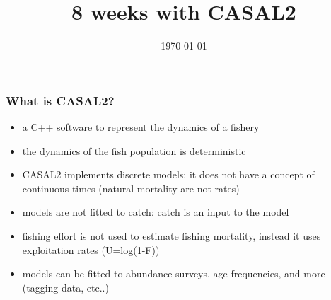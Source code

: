 \documentclass{beamer}
\title[]{8 weeks with CASAL2} %
\date{\today} %
\begin{document}
\begin{frame}
\titlepage %
\end{frame}






\begin{frame}
\frametitle{What is CASAL2?}
\begin{itemize}
\item a C++ software to represent the dynamics of a fishery
\item the dynamics of the fish population is deterministic
\item CASAL2 implements discrete models: it does not have a concept of continuous times (natural mortality are not rates)
\item models are not fitted to catch: catch is an input to the model
\item fishing effort is not used to estimate fishing mortality, instead it uses exploitation rates (U=log(1-F))
\item models can be fitted to abundance surveys, age-frequencies, and more (tagging data, etc..)
\end{itemize}
\end{frame}
\end{document}
